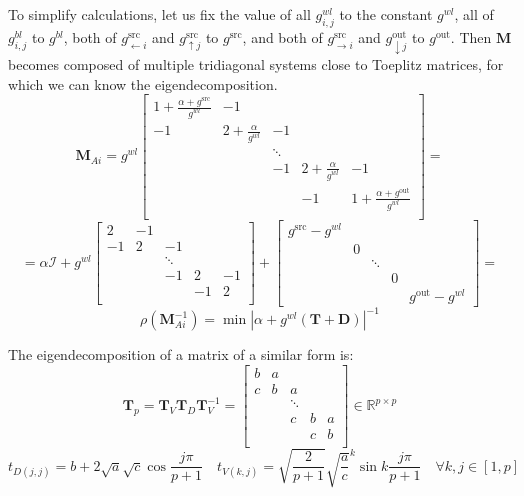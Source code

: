 \documentclass[journal,onecolumn]{IEEEtran}
\begin{document}
\iffalse
    To simplify calculations, let us fix the value of all $g^{wl}_{i,j}$ to the constant $g^{wl}$, all of $g^{bl}_{i,j}$ to $g^{bl}$, both of $g^\text{src}_{\leftarrow i}$ and $g^\text{src}_{\uparrow j}$ to $g^\text{src}$, and both of $g^\text{src}_{\rightarrow i}$ and $g^\text{out}_{\downarrow j}$ to $g^\text{out}$. Then $\mathbf{M}$ becomes composed of multiple tridiagonal systems close to Toeplitz matrices, for which we can know the eigendecomposition.  %
    $$\mathbf{M}^{}_{Ai} = g^{wl}\begin{bmatrix}
        1 + \frac{\alpha + g^\text{src}}{g^{wl}} & -1 \\
        -1 & 2 + \frac{\alpha}{g^{wl}} & -1 \\
        & & \ddots \\
        & & -1 & 2 + \frac{\alpha}{g^{wl}} & -1 \\
        & & & -1 & 1 + \frac{\alpha + g^\text{out}}{g^{wl}} \\
    \end{bmatrix} =$$ $$= \alpha \mathcal{I} + g^{wl}\begin{bmatrix} 
    2 & -1 \\ -1 & 2 & -1 \\ && \ddots \\ && -1 & 2 & -1 \\ &&& -1 & 2 \\ 
    \end{bmatrix} + \begin{bmatrix} 
    g^\text{src} - g^{wl} \\ & 0 \\ && \ddots \\ &&& 0 \\ &&&& g^\text{out} - g^{wl} 
    \end{bmatrix} =$$ $$\rho(\mathbf{M}^{-1}_{Ai}) = \min{\left| \alpha + g^{wl}(\mathbf{T} + \mathbf{D}) \right|}^{-1}$$

    The eigendecomposition of a matrix of a similar form is:
    $$\mathbf{T}^{}_{p} = \mathbf{T}^{}_{V}\mathbf{T}^{}_{D}\mathbf{T}^{-1}_{V} = \begin{bmatrix}
        b & a \\ %
        c & b & a \\
        & & \ddots \\
        & & c & b & a \\
        & & & c & b \\ %
    \end{bmatrix} \in \mathbb{R}^{p \times p}$$
    $$t_{D(j,j)} = b + 2\sqrt{a}\sqrt{c}\cos{\frac{j\pi}{p + 1}} \quad t_{V(k,j)} = \sqrt{\frac{2}{p + 1}} \sqrt{\frac{a}{c}}^k\sin{k\frac{j\pi}{p + 1}} \quad \forall k, j \in [1, p]$$
    
\end{document}
